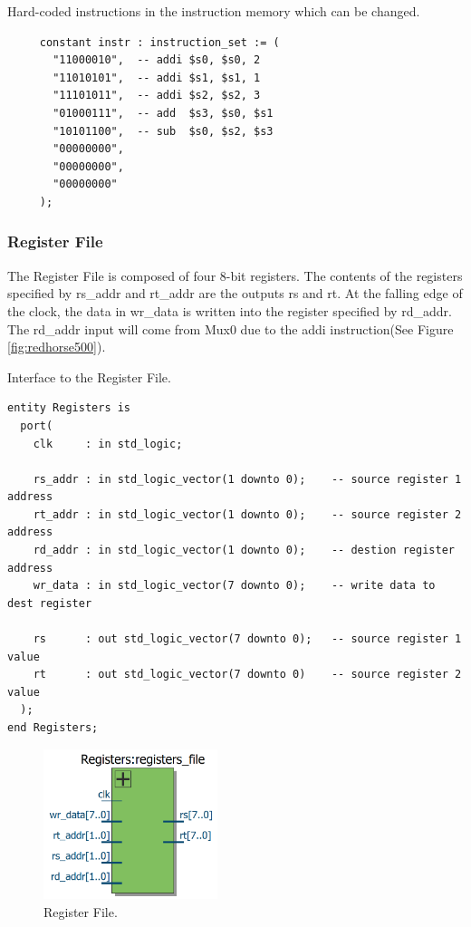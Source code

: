 \documentclass[a4paper, 11pt,oneside]{article}
\begin{document}
\begin{listing}[H]
\caption{Hard-coded instructions in the instruction memory which can be 
changed.}
\label{code:im_code}
\begin{verbatim}
     constant instr : instruction_set := (
       "11000010",  -- addi $s0, $s0, 2
       "11010101",  -- addi $s1, $s1, 1
       "11101011",  -- addi $s2, $s2, 3
       "01000111",  -- add  $s3, $s0, $s1
       "10101100",  -- sub  $s0, $s2, $s3
       "00000000",
       "00000000",
       "00000000"
     );    
\end{verbatim}
\end{listing}


\subsubsection{Register File}
The Register File is composed of four 8-bit registers. The contents of the 
registers specified by rs\_addr and rt\_addr are the outputs rs and rt. At the 
falling edge of the clock, the data in wr\_data is written into the register 
specified by rd\_addr. The rd\_addr input will come from Mux0 due to the addi 
instruction(See Figure \ref{fig:redhorse500}).


\begin{listing}[H]
\caption{Interface to the Register File.}
\label{code:rf}
\begin{verbatim}
entity Registers is
  port(
    clk     : in std_logic;

    rs_addr : in std_logic_vector(1 downto 0);    -- source register 1 address
    rt_addr : in std_logic_vector(1 downto 0);    -- source register 2 address
    rd_addr : in std_logic_vector(1 downto 0);    -- destion register address
    wr_data : in std_logic_vector(7 downto 0);    -- write data to dest register

    rs      : out std_logic_vector(7 downto 0);   -- source register 1 value
    rt      : out std_logic_vector(7 downto 0)    -- source register 2 value
  );
end Registers;

\end{verbatim}
\end{listing}

\begin{figure}[H]
	\begin{center}
	\includegraphics[width=2in]{rf.png}
	\caption{Register File.}
	\label{fig:rf} 
	\end{center}
\end{figure}
\end{document}
